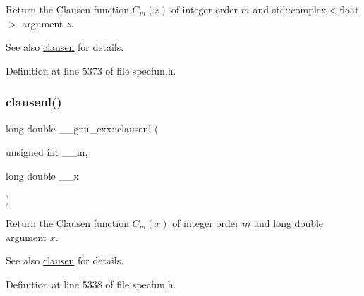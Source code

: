 Return the Clausen function $ C_m(z) $ of integer order $ m $ and {\ttfamily std\+::complex$<$float$>$} argument $ z $.

\begin{DoxySeeAlso}{See also}
\hyperlink{group__gnu__math__spec__func_ga54e4ba71b1f81718d6998349f91ff88f}{clausen} for details. 
\end{DoxySeeAlso}


Definition at line 5373 of file specfun.\+h.

\mbox{\label{group__gnu__math__spec__func_ga33132bab39c8d78dde807b45fc06de52}} 
\subsubsection{\texorpdfstring{clausenl()}{clausenl()}\hspace{0.1cm}{\footnotesize\ttfamily [1/2]}}
{\footnotesize\ttfamily long double \+\_\+\+\_\+gnu\+\_\+cxx\+::clausenl (\begin{DoxyParamCaption}\item[{unsigned int}]{\+\_\+\+\_\+m,  }\item[{long double}]{\+\_\+\+\_\+x }\end{DoxyParamCaption})\hspace{0.3cm}{\ttfamily [inline]}}

Return the Clausen function $ C_m(x) $ of integer order $ m $ and {\ttfamily long double} argument $ x $.

\begin{DoxySeeAlso}{See also}
\hyperlink{group__gnu__math__spec__func_ga54e4ba71b1f81718d6998349f91ff88f}{clausen} for details. 
\end{DoxySeeAlso}


Definition at line 5338 of file specfun.\+h.

\mbox{\label{group__gnu__math__spec__func_gae39368808280f5c1b80dce7c2f4a67a7}} 
